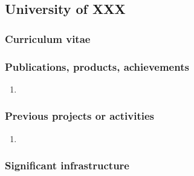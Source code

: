 \subsection*{University of XXX}



\subsubsection*{Curriculum vitae}


%
%
%

\subsubsection*{Publications, products, achievements}

\begin{enumerate}
\item {}
\end{enumerate}

\subsubsection*{Previous projects or activities}

\begin{enumerate}
\item {}
\end{enumerate}

\subsubsection*{Significant infrastructure}

